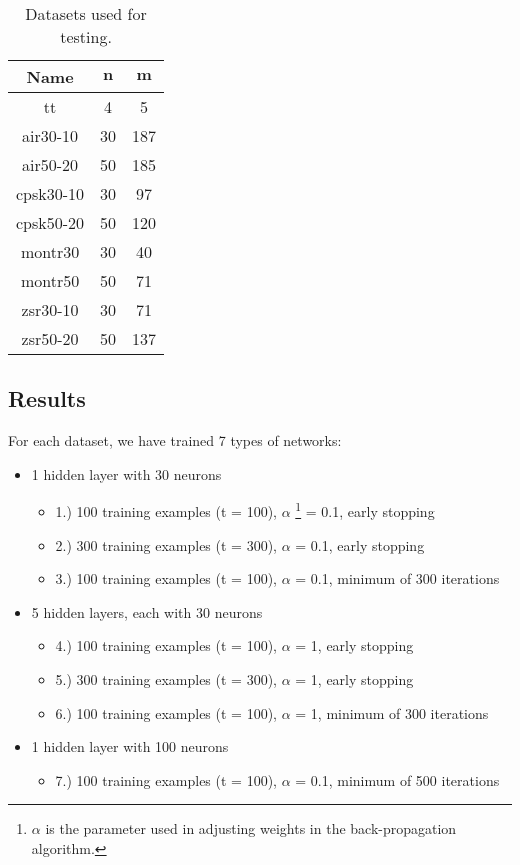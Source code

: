 \begin{table}[h]
	\centering
	\begin{tabular}{c|c|c}
            \rowcolor{tablehead}
            \textbf{Name} & \textbf{$\bm{n}$} & \textbf{$\bm{m}$} \\
            \hline
        	tt & 4 & 5 \\
			air30-10 & 30 & 187 \\
			air50-20 & 50 & 185 \\
			cpsk30-10 & 30 & 97 \\
			cpsk50-20 & 50 & 120 \\
			montr30 & 30 & 40 \\
			montr50 & 50 & 71 \\
			zsr30-10 & 30 & 71 \\
			zsr50-20 & 50 & 137 \\
        \end{tabular}
        \caption{\label{tab:datasets} Datasets used for testing.}
	\normalsize
\end{table} 
	
\subsection{Results}
	
	For each dataset, we have trained 7 types of networks:
	\begin{itemize}
		\item 1 hidden layer with 30 neurons
		\begin{itemize}
			\item 1.) 100 training examples (t = 100), $\alpha$ \footnote{$\alpha$ is the parameter used in adjusting weights in the back-propagation algorithm.} = 0.1, early stopping
			\item 2.) 300 training examples (t = 300), $\alpha$ = 0.1, early stopping
			\item 3.) 100 training examples (t = 100), $\alpha$ = 0.1, minimum of 300 iterations
		\end{itemize}
		\item 5 hidden layers, each with 30 neurons
		\begin{itemize}
			\item 4.) 100 training examples (t = 100), $\alpha$ = 1, early stopping
			\item 5.) 300 training examples (t = 300), $\alpha$ = 1, early stopping
			\item 6.) 100 training examples (t = 100), $\alpha$ = 1, minimum of 300 iterations
		\end{itemize}
		\item 1 hidden layer with 100 neurons
		\begin{itemize}
			\item 7.) 100 training examples (t = 100), $\alpha$ = 0.1, minimum of 500 iterations
		\end{itemize}
	\end{itemize}
	\hspace{\fill}
	
